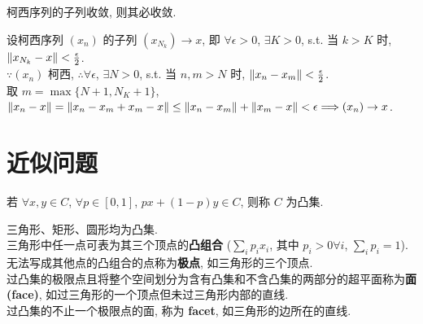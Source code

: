 \documentclass{note}
\begin{document}
\begin{cor}\label{cor-13.1}
    柯西序列的子列收敛, 则其必收敛.
\end{cor}
\begin{pf}
    设柯西序列 $(x_n)$ 的子列 $(x_{N_k})\rightarrow x$, 即 $\forall\epsilon>0$, $\exists K>0$, s.t. 当 $k>K$ 时, $\left\lVert x_{N_k}-x\right\rVert<\frac{\epsilon}{2}$.\\
    $\because(x_n)$ 柯西, $\therefore\forall\epsilon$, $\exists N>0$, s.t. 当 $n,m>N$ 时, $\left\lVert x_n-x_m\right\rVert<\frac{\epsilon}{2}$.\\
    取 $m=\max\{N+1,N_K+1\}$, $\left\lVert x_n-x\right\rVert=\left\lVert x_n-x_m+x_m-x\right\rVert\leq\left\lVert x_n-x_m\right\rVert+\left\lVert x_m-x\right\rVert<\epsilon\Longrightarrow(x_n)\rightarrow x$.
\end{pf}

\section{近似问题}
\begin{df}[凸集]
    若 $\forall x,y\in C$, $\forall p\in[0,1]$, $px+(1-p)y\in C$, 则称 $C$ 为凸集.
\end{df}
\begin{eg}
    三角形、矩形、圆形均为凸集.\\
    三角形中任一点可表为其三个顶点的\textbf{凸组合} ($\sum_ip_ix_i$, 其中 $p_i>0\forall i$, $\sum_ip_i=1$).\\
    无法写成其他点的凸组合的点称为\textbf{极点}, 如三角形的三个顶点.\\
    过凸集的极限点且将整个空间划分为含有凸集和不含凸集的两部分的超平面称为\textbf{面 (face)}, 如过三角形的一个顶点但未过三角形内部的直线.\\
    过凸集的不止一个极限点的面, 称为 \textbf{facet}, 如三角形的边所在的直线.
\end{eg}
\end{document}
